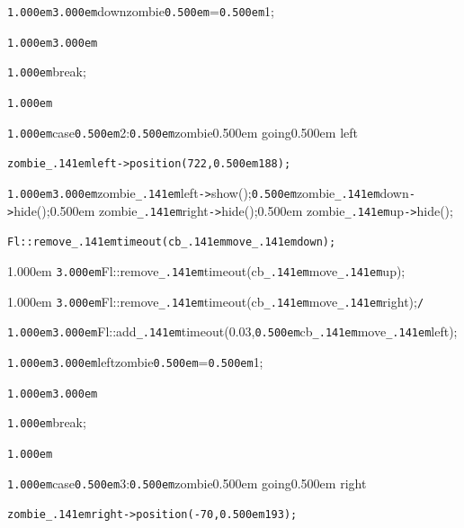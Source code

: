 \documentclass[12pt]{article}
\begin{document}
\noindent
{}{\tt\mc \kern1.000em}{\tt\mc \kern3.000em}downzombie{\tt\mc \kern0.500em}={\tt\mc \kern0.500em}1;

\noindent
{}{\tt\mc \kern1.000em}{\tt\mc \kern3.000em}

\noindent
{}{\tt\mc \kern1.000em}break;

\noindent
{}{\tt\mc \kern1.000em}

\noindent
{}{\tt\mc \kern1.000em}case{\tt\mc \kern0.500em}2:{\tt\mc \kern0.500em}\rm\mc {\tt /}{\tt /}zombie\kern0.500em going\kern0.500em left

\noindent
\tt\mc {\tt\mc \kern1.000em}{\tt\mc \kern3.000em}zombie{\tt\_\kern.141em}left{\tt -}{\tt >}position(722,{\tt\mc \kern0.500em}188);

\noindent
{}{\tt\mc \kern1.000em}{\tt\mc \kern3.000em}zombie{\tt\_\kern.141em}left{\tt -}{\tt >}show();{\tt\mc \kern0.500em}\rm\mc {\tt /}{\tt /}zombie{\tt\_\kern.141em}down{\tt -}{\tt >}hide();\kern0.500em zombie{\tt\_\kern.141em}right{\tt -}{\tt >}hide();\kern0.500em zombie{\tt\_\kern.141em}up{\tt -}{\tt >}hide();

\noindent
\tt\mc {\tt\mc \kern1.000em}{\tt\mc \kern3.000em}\rm\mc {\tt /}{\tt *}Fl::remove{\tt\_\kern.141em}timeout(cb{\tt\_\kern.141em}move{\tt\_\kern.141em}down);

\noindent
\kern1.000em {\tt\mc \kern3.000em}Fl::remove{\tt\_\kern.141em}timeout(cb{\tt\_\kern.141em}move{\tt\_\kern.141em}up);

\noindent
\kern1.000em {\tt\mc \kern3.000em}Fl::remove{\tt\_\kern.141em}timeout(cb{\tt\_\kern.141em}move{\tt\_\kern.141em}right);{\tt *}{\tt /}
\tt\mc 

\noindent
{}{\tt\mc \kern1.000em}{\tt\mc \kern3.000em}Fl::add{\tt\_\kern.141em}timeout(0.03,{\tt\mc \kern0.500em}cb{\tt\_\kern.141em}move{\tt\_\kern.141em}left);

\noindent
{}{\tt\mc \kern1.000em}{\tt\mc \kern3.000em}leftzombie{\tt\mc \kern0.500em}={\tt\mc \kern0.500em}1;

\noindent
{}{\tt\mc \kern1.000em}{\tt\mc \kern3.000em}

\noindent
{}{\tt\mc \kern1.000em}break;

\noindent
{}{\tt\mc \kern1.000em}

\noindent
{}{\tt\mc \kern1.000em}case{\tt\mc \kern0.500em}3:{\tt\mc \kern0.500em}\rm\mc {\tt /}{\tt /}zombie\kern0.500em going\kern0.500em right

\noindent
\tt\mc {\tt\mc \kern1.000em}{\tt\mc \kern3.000em}zombie{\tt\_\kern.141em}right{\tt -}{\tt >}position({\tt -}70,{\tt\mc \kern0.500em}193);
\end{document}
